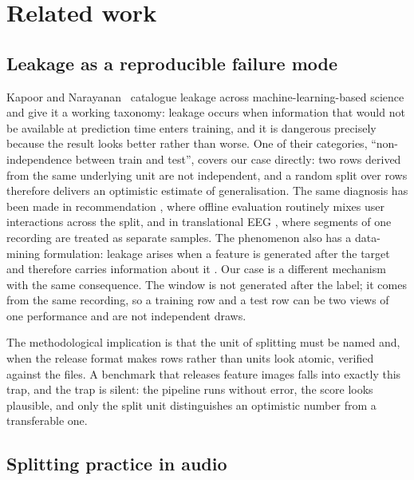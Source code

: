 \section{Related work}\label{sec:related}

\subsection{Leakage as a reproducible failure mode}

Kapoor and Narayanan~\cite{kapoor2023leakage} catalogue leakage across machine-learning-based science and give it
a working taxonomy: leakage occurs when information that would not be available at prediction
time enters training, and it is dangerous precisely because the result looks better rather than
worse. One of their categories, ``non-independence between train and test'', covers our case
directly: two rows derived from the same underlying unit are not independent, and a random
split over rows therefore delivers an optimistic estimate of generalisation. The same
diagnosis has been made in recommendation \citep{ji2023leakage}, where offline evaluation
routinely mixes user interactions across the split, and in translational
EEG \citep{brookshire2024eeg}, where segments of one recording are treated as separate samples. The phenomenon also has a data-mining formulation: leakage arises when a feature is generated
after the target and therefore carries information about it \citep{kaufman2012}. Our case is a
different mechanism with the same consequence. The window is not generated after the label; it
comes from the same recording, so a training row and a test row can be two views of one
performance and are not independent draws.

The methodological implication is that the unit of splitting must be named and, when the release
format makes rows rather than units look atomic, verified against the files. A benchmark that
releases feature images falls into exactly this trap, and the trap is silent: the pipeline runs
without error, the score looks plausible, and only the split unit distinguishes an optimistic
number from a transferable one.

\subsection{Splitting practice in audio}

